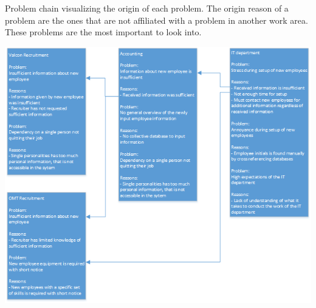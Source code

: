 \label{app:ProblemChain}

Problem chain visualizing the origin of each problem.
The origin reason of a problem are the ones that are not affiliated with a problem in another work area.
These problems are the most important to look into.

\includegraphics[scale=0.75]{appendix/ProblemChain.png}